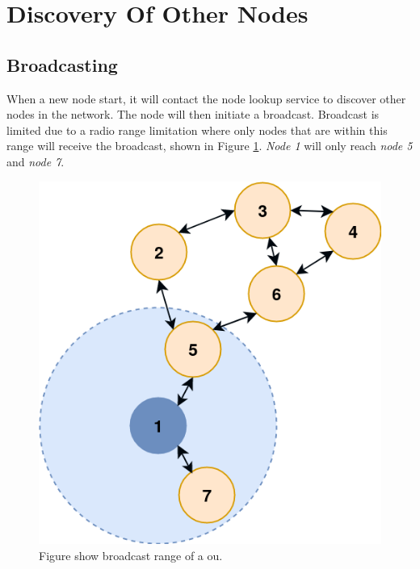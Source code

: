 \documentclass[USenglish]{uit-thesis}
\begin{document}

\section{Discovery Of Other Nodes}
\subsection{Broadcasting}
When a new node start, it will contact the node lookup service to discover other nodes in the network. The node will then initiate a broadcast.
Broadcast is limited due to a radio range limitation where only nodes that are within this range will receive the broadcast, shown in Figure \ref{fig:broadcast_range}. \textit{Node 1} will only reach \textit{node 5} and \textit{node 7}.


\begin{figure}
\centering
\includegraphics[scale=0.4]{broadcast_range.png}
\caption{Figure show broadcast range of a \gls{ou}.}
\label{fig:broadcast_range}
\end{figure}


\end{document}
